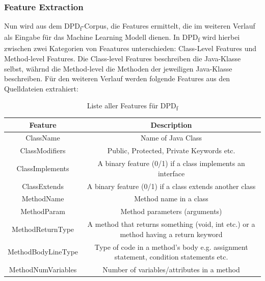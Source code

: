 \documentclass[conference]{IEEEtran}
\begin{document}
\subsubsection*{Feature Extraction}

Nun wird aus dem DPD\textsubscript{f}-Corpus, die Features ermittelt, die im weiteren Verlauf als Eingabe für das Machine Learning Modell dienen. In DPD\textsubscript{f} wird hierbei zwischen zwei Kategorien von Feaatures unterschieden: Class-Level Features und Method-level Features.
Die Class-level Features beschreiben die Java-Klasse selbst, währnd die Method-level die Methoden der jeweiligen Java-Klasse beschreiben.
Für den weiteren Verlauf werden folgende Features aus den Quelldateien extrahiert:

\begin{table}
    \centering
    \caption{Liste aller Features für DPD\textsubscript{f}}
    \label{table:6}
    \begin{tabular}{|c|c|}
        \hline
        Feature              & Description                                                                          \\
        \hline
        ClassName            & Name of Java Class                                                                   \\
        \hline
        ClassModiﬁers        & Public, Protected, Private Keywords etc.                                             \\
        \hline
        ClassImplements      & A binary feature (0/1) if a class implements an interface                            \\
        \hline
        ClassExtends         & A binary feature (0/1) if a class extends another class                              \\
        \hline
        MethodName           & Method name in a class                                                               \\
        \hline
        MethodParam          & Method parameters (arguments)                                                        \\
        \hline
        MethodReturnType     & A method that returns something (void, int etc.) or a method having a return keyword \\
        \hline
        MethodBodyLineType   & Type of code in a method’s body e.g. assignment statement, condition statements etc. \\
        \hline
        MethodNumVariables   & Number of variables/attributes in a method                                           \\

\end{tabular}
\end{table}
\end{document}

